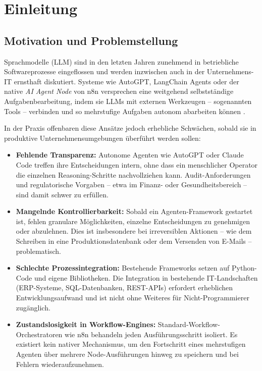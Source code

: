 \documentclass[12pt,a4paper,oneside]{report}
\begin{document}
\chapter{Einleitung}

\section{Motivation und Problemstellung}

Sprachmodelle (\acf{LLM}) sind in den letzten Jahren zunehmend in betriebliche
Softwareprozesse eingeflossen und werden inzwischen auch in der Unternehmens-IT
ernsthaft diskutiert. Systeme wie AutoGPT, LangChain Agents
oder der native \textit{AI Agent Node} von n8n versprechen eine weitgehend selbstständige
Aufgabenbearbeitung, indem sie \ac{LLM}s mit externen Werkzeugen -- sogenannten Tools
-- verbinden und so mehrstufige Aufgaben autonom abarbeiten können \cite{wang2023survey}.

In der Praxis offenbaren diese Ansätze jedoch erhebliche Schwächen, sobald sie in
produktive Unternehmensumgebungen überführt werden sollen:

\begin{itemize}
  \item \textbf{Fehlende Transparenz:} Autonome Agenten wie AutoGPT oder Claude Code
    treffen ihre Entscheidungen intern, ohne dass ein menschlicher Operator die einzelnen
    Reasoning-Schritte nachvollziehen kann. Audit-Anforderungen und regulatorische
    Vorgaben -- etwa im Finanz- oder Gesundheitsbereich -- sind damit schwer zu erfüllen.

  \item \textbf{Mangelnde Kontrollierbarkeit:} Sobald ein Agenten-Framework gestartet
    ist, fehlen granulare Möglichkeiten, einzelne Entscheidungen zu genehmigen oder
    abzulehnen. Dies ist insbesondere bei irreversiblen Aktionen -- wie dem Schreiben
    in eine Produktionsdatenbank oder dem Versenden von E-Mails -- problematisch.

  \item \textbf{Schlechte Prozessintegration:} Bestehende Frameworks setzen auf
    Python-Code und eigene Bibliotheken. Die Integration in bestehende IT-Landschaften
    (ERP-Systeme, SQL-Datenbanken, REST-\ac{API}s) erfordert erheblichen Entwicklungsaufwand
    und ist nicht ohne Weiteres für Nicht-Programmierer zugänglich.

  \item \textbf{Zustandslosigkeit in Workflow-Engines:} Standard-Workflow-Orchestratoren
    wie n8n behandeln jeden Ausführungsschritt isoliert. Es existiert kein nativer
    Mechanismus, um den Fortschritt eines mehrstufigen Agenten über mehrere
    Node-Ausführungen hinweg zu speichern und bei Fehlern wiederaufzunehmen.
\end{itemize}
\end{document}
